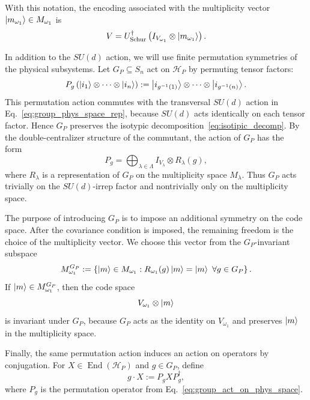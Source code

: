 \documentclass[10pt,twocolumn,superscriptaddress,aps,amsmath,amssymb,citeautoscript,floatfix,prx,longbibliography]{revtex4-2}
\theoremstyle{plain}
\theoremstyle{plain}
\theoremstyle{plain}
\theoremstyle{plain}
\theoremstyle{plain}
\theoremstyle{plain}
\begin{document}
With this notation, the encoding associated with the multiplicity vector $\ket{m_{\omega_1}}\in M_{\omega_1}$ is
\begin{equation}\label{eq:schur_transform_enc}
    V
    =
    U_{\mathrm{Schur}}^\dagger
    \left(
        I_{V_{\omega_1}}
        \otimes
        \ket{m_{\omega_1}}
    \right).
\end{equation}

In addition to the $SU(d)$ action, we will use finite permutation symmetries of the physical subsystems. Let $G_P\subseteq S_n$ act on $\mathcal H_P$ by permuting tensor factors:
\begin{equation}\label{eq:group_act_on_phys_space}
    P_g
    \left(
        \ket{i_1}\otimes\cdots\otimes\ket{i_n}
    \right)
    :=
    \ket{i_{g^{-1}(1)}}\otimes\cdots\otimes\ket{i_{g^{-1}(n)}} .
\end{equation}
This permutation action commutes with the transversal $SU(d)$ action in Eq.~\eqref{eq:group_phys_space_rep}, because $SU(d)$ acts identically on each tensor factor. Hence $G_P$ preserves the isotypic decomposition~\eqref{eq:isotipic_decomp}. By the double-centralizer structure of the commutant, the action of $G_P$ has the form~\cite{GoodmanWallach2009}
\begin{equation}\label{eq:group_act_on_code}
    P_g
    =
    \bigoplus_{\lambda\in\Lambda}
    I_{V_\lambda}\otimes R_\lambda(g),
\end{equation}
where $R_\lambda$ is a representation of $G_P$ on the multiplicity space $M_\lambda$. Thus $G_P$ acts trivially on the $SU(d)$-irrep factor and nontrivially only on the multiplicity space.

The purpose of introducing $G_P$ is to impose an additional symmetry on the code space. After the covariance condition is imposed, the remaining freedom is the choice of the multiplicity vector. We choose this vector from the $G_P$-invariant subspace
\begin{equation}\label{eq:g_inv_subspace}
    M_{\omega_1}^{G_P}
    :=
    \left\{
        \ket m\in M_{\omega_1}
        :
        R_{\omega_1}(g)\ket m=\ket m
        \ \forall g\in G_P
    \right\}.
\end{equation}
If $\ket m\in M_{\omega_1}^{G_P}$, then the code space
$$
    V_{\omega_1}\otimes\ket m
$$
is invariant under $G_P$, because $G_P$ acts as the identity on $V_{\omega_1}$ and preserves $\ket m$ in the multiplicity space.

Finally, the same permutation action induces an action on operators by conjugation. For $X\in\operatorname{End}(\mathcal H_P)$ and $g\in G_P$, define
\begin{equation}\label{eq:group_act_oper}
    g\cdot X
    :=
    P_gXP_g^\dagger,
\end{equation}
where $P_g$ is the permutation operator from Eq.~\eqref{eq:group_act_on_phys_space}.
\end{document}
